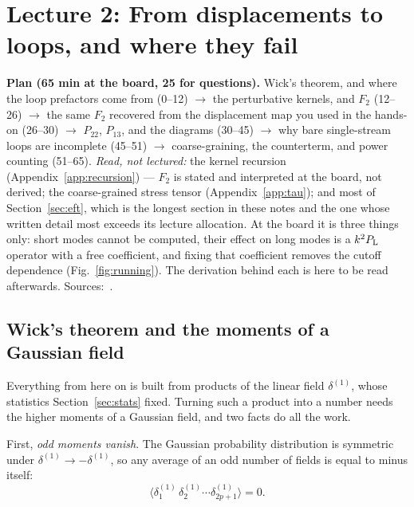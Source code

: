 \documentclass[a4paper,11pt]{article}
\def\Plin{P_{\rm L}}
\numberwithin{equation}{section}
\newcounter{exercise}[section]
\begin{document}
\section*{Lecture 2: From displacements to loops, and where they fail}
\setcounter{section}{2}
\setcounter{subsection}{0}
\setcounter{equation}{0}
\setcounter{exercise}{0}

\noindent\textbf{Plan (65 min at the board, 25 for questions).} Wick's theorem, and where the loop prefactors come from (0--12) $\rightarrow$ the perturbative kernels, and $F_2$ (12--26) $\rightarrow$ the same $F_2$ recovered from the displacement map you used in the hands-on (26--30) $\rightarrow$ $P_{22}$, $P_{13}$, and the diagrams (30--45) $\rightarrow$ why bare single-stream loops are incomplete (45--51) $\rightarrow$ coarse-graining, the counterterm, and power counting (51--65). \emph{Read, not lectured:} the kernel recursion (Appendix~\ref{app:recursion}) --- $F_2$ is stated and interpreted at the board, not derived; the coarse-grained stress tensor (Appendix~\ref{app:tau}); and most of Section~\ref{sec:eft}, which is the longest section in these notes and the one whose written detail most exceeds its lecture allocation. At the board it is three things only: short modes cannot be computed, their effect on long modes is a $k^2\Plin$ operator with a free coefficient, and fixing that coefficient removes the cutoff dependence (Fig.~\ref{fig:running}). The derivation behind each is here to be read afterwards. Sources:~\cite{Bernardeau2002,BaumannCargese,Baumann2010,Carrasco2012,Carroll2013}.

\subsection{Wick's theorem and the moments of a Gaussian field}
\label{sec:wick}

Everything from here on is built from products of the linear field
$\delta^{(1)}$, whose statistics Section~\ref{sec:stats} fixed. Turning such a
product into a number needs the higher moments of a Gaussian field, and two
facts do all the work.

First, \emph{odd moments vanish}. The Gaussian probability distribution is symmetric under $\delta^{(1)} \to -\delta^{(1)}$, so any average of an odd number of fields is equal to minus itself:
\begin{equation}
\langle \delta^{(1)}_1\,\delta^{(1)}_2\cdots\delta^{(1)}_{2p+1}\rangle = 0 .
\label{eq:odd_vanish}
\end{equation}
\end{document}
